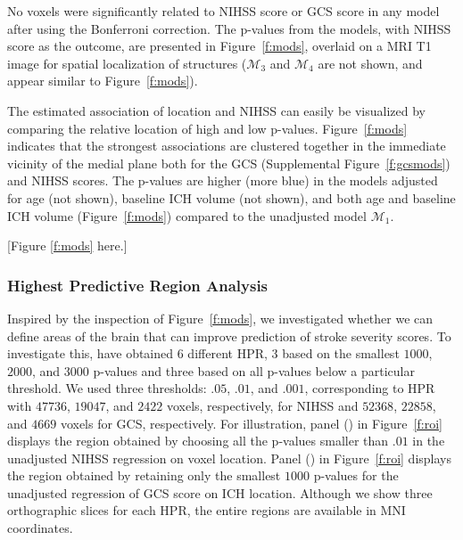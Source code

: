 \documentclass[10pt]{article}\usepackage[]{graphicx}\usepackage[]{color}
\begin{document}
No voxels were significantly related to NIHSS score or GCS score in any model after using the Bonferroni correction.  The p-values from the models, with NIHSS score as the outcome, are presented in Figure~\ref{f:mods}, overlaid on a MRI T1 image for spatial localization of structures ($\mathcal{M}_3$ and $\mathcal{M}_4$ are not shown, and appear similar to Figure~\ref{f:mods}\protect{}).  

The estimated association of location and NIHSS can easily be visualized by comparing the relative location of high and low p-values. Figure~\ref{f:mods} indicates that the strongest associations are clustered together in the immediate vicinity of the medial plane both for the GCS (Supplemental Figure~\ref{f:gcsmods}) and NIHSS scores.  The p-values are higher (more blue) in the models adjusted for age (not shown), baseline ICH volume (not shown), and both age and baseline ICH volume (Figure~\ref{f:mods}\protect{}) compared to the unadjusted model $\mathcal{M}_1$.  

[Figure \ref{f:mods} here.]

\subsubsection{Highest Predictive Region Analysis}






Inspired by the inspection of Figure~\ref{f:mods}, we investigated whether we can define areas of the brain that can improve prediction of stroke severity scores. To investigate this, have obtained 6 different HPR, 3 based on the smallest $1000$, $2000$, and $3000$ p-values and three based on all p-values below a particular threshold. We used three thresholds: $.05$, $.01$, and $.001$, corresponding to HPR with $47736$, $19047$, and $2422$ voxels, respectively, for NIHSS and $52368$, $22858$, and $4669$ voxels for GCS, respectively. For illustration, panel (\protect{}) in Figure~\ref{f:roi} displays the region obtained by choosing all the p-values smaller than $.01$ in the unadjusted NIHSS regression on voxel location.  Panel (\protect{}) in Figure~\ref{f:roi} displays the region obtained by retaining only the smallest $1000$ p-values for the unadjusted regression of GCS score on ICH location. Although we show three orthographic slices for each HPR, the entire regions are available in MNI coordinates. 
\end{document}
